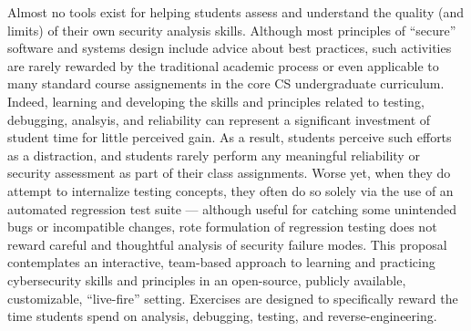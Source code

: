 \documentclass[11pt]{report}
\begin{document}
Almost no tools exist for helping students assess and
understand the quality (and limits) of their own security analysis
skills.  Although most principles of ``secure'' software and systems
design include advice about best practices, such activities are rarely
rewarded by the traditional academic process or even applicable to
many standard course assignements in the core CS undergraduate
curriculum.  Indeed, learning and developing the skills and principles
related to testing, debugging, analsyis, and reliability can represent
a significant investment of student time for little perceived gain. As
a result, students perceive such efforts as a distraction, and
students rarely perform any meaningful reliability or security
assessment as part of their class assignments.  Worse yet, when they do
attempt to internalize testing concepts, they often do so solely via
the use of an automated regression test suite --- although useful for
catching some unintended bugs or incompatible changes, rote
formulation of regression testing does not reward careful and
thoughtful analysis of security failure modes.
This proposal contemplates an interactive, team-based
approach to learning and practicing cybersecurity skills and
principles in an open-source, publicly available, customizable,
``live-fire'' setting.  Exercises are designed to specifically reward the time
students spend on analysis, debugging, testing, and
reverse-engineering.  


\end{document}
